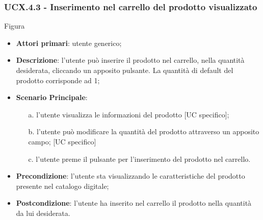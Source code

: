 \subsubsection{UCX.4.3 - Inserimento nel carrello del prodotto visualizzato}
Figura \\
\begin{itemize}
\item \textbf{Attori primari}: utente generico;
\item \textbf{Descrizione}: l'utente può inserire il prodotto nel carrello, nella quantità desiderata, cliccando un apposito pulsante. La quantità di default del prodotto corrisponde ad 1;
\item \textbf{Scenario Principale}:
\begin{enumerate}
\item[a.] l'utente visualizza le informazioni del prodotto [UC specifico];
\item[b.] l'utente può modificare la quantità del prodotto attraverso un apposito campo; [UC specifico]
\item[c.] l'utente preme il pulsante per l'inserimento del prodotto nel carrello.
\end{enumerate}
\item \textbf{Precondizione}: l'utente sta visualizzando le caratteristiche del prodotto presente nel catalogo digitale;
\item \textbf{Postcondizione}: l'utente ha inserito nel carrello il prodotto nella quantità da lui desiderata.
\end{itemize}
